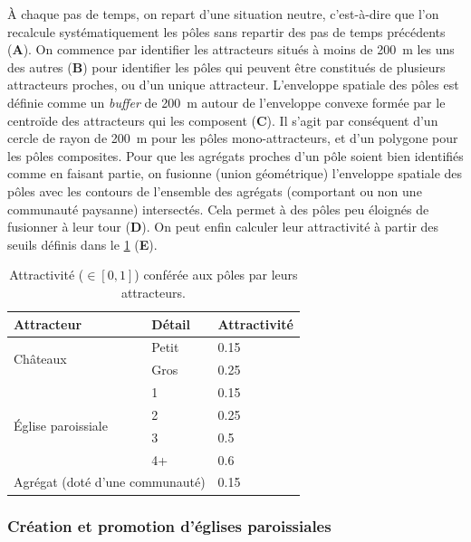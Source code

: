 À chaque pas de temps, on repart d'une situation \og neutre\fg{}, c'est-à-dire que l'on recalcule systématiquement les pôles sans repartir des pas de temps précédents (\textbf{A}).
On commence par identifier les attracteurs situés à moins de 200~m les uns des autres (\textbf{B}) pour identifier les pôles qui peuvent être constitués de plusieurs attracteurs proches, ou d'un unique attracteur.
L'enveloppe spatiale des pôles est définie comme un \textit{buffer} de 200~m autour de l'enveloppe convexe formée par le centroïde des attracteurs qui les composent (\textbf{C}).
Il s'agit par conséquent d'un cercle de rayon de 200~m pour les pôles mono-attracteurs, et d'un polygone pour les pôles composites.
Pour que les agrégats proches d'un pôle soient bien identifiés comme en faisant partie, on fusionne (union géométrique) l'enveloppe spatiale des pôles avec les contours de l'ensemble des agrégats (comportant ou non une communauté paysanne) intersectés.
Cela permet à des pôles peu éloignés de fusionner à leur tour (\textbf{D}).
On peut enfin calculer leur attractivité à partir des seuils définis dans le \cref{tab:attraction-poles} (\textbf{E}).

\begin{table}[H]
	\centering
	{\renewcommand{\arraystretch}{1.1}%
	\begin{tabular}{|l|l|l|}\hline
		\textbf{Attracteur} & \textbf{Détail} & \textbf{Attractivité} \\ \hline
		\multirow{2}{*}{Châteaux} & Petit & 0.15 \\
		& Gros & 0.25 \\ \hline
		\multirow{4}{*}{Église paroissiale} & 1 & 0.15 \\
		& 2 & 0.25 \\
		& 3 & 0.5 \\
		& 4+ & 0.6 \\ \hline
		\multicolumn{2}{|l|}{Agrégat (doté d'une communauté)} & 0.15 \\ \hline
	\end{tabular}}
\caption[Attractivité conférée aux pôles par leurs attracteurs.]{Attractivité ($\in [0,1]$) conférée aux pôles par leurs attracteurs.}
\label{tab:attraction-poles}
\end{table}


	
\subsubsection{Création et promotion d'églises paroissiales \label{sssec:paroisses}}

